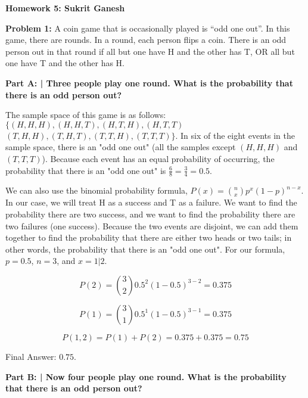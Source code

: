 \documentclass{article}
\begin{document}
 
 \begin{center}
     \Huge\textbf{Homework 5: Sukrit Ganesh}\par
 \end{center}
 
  \noindent\makebox[\linewidth]{\rule{\paperwidth}{0.4pt}}\newline
 
 \begin{center}
      \Large\textbf{Problem 1:} A coin game that is occasionally played is “odd one out”. In this game, there are rounds. In a round, each person flips a coin. There is an odd person out in that round if all but one have H and the other has T, OR all but one have T and the other has H. \par
 \end{center}
 
 \textbf{Part A: | Three people play one round. What is the probability that there is an odd person out?}\newline
 
 The sample space of this game is as follows: $\{(H, H, H), (H, H, T), (H, T, H), (H, T, T)$ $(T, H, H), (T, H, T), (T, T, H), (T, T, T)\}$. In six of the eight events in the sample space, there is an "odd one out" (all the samples except $(H, H, H)$ and $(T, T, T)$). Because each event has an equal probability of occurring, the probability that there is an "odd one out" is $\frac{6}{8} = \frac{3}{4} = 0.5$.\newline
 
 We can also use the binomial probability formula, $P(x)={n \choose x}p^x(1-p)^{n-x}$. In our case, we will treat H as a success and T as a failure. We want to find the probability there are two success, and we want to find the probability there are two failures (one success). Because the two events are disjoint, we can add them together to find the probability that there are either two heads or two tails; in other words, the probability that there is an "odd one out". For our formula, $p = 0.5$, $n = 3$, and $x = 1 | 2$.
 
 \[P(2)={3 \choose 2}0.5^2(1-0.5)^{3-2} = 0.375\]
 
 \[P(1)={3 \choose 1}0.5^1(1-0.5)^{3-1} = 0.375\]
 
 \[P(1, 2)=P(1)+P(2) = 0.375 + 0.375 = 0.75\]

 Final Answer: $0.75$.\newline
 
 \textbf{Part B: | Now four people play one round. What is the probability that there is an odd person out?}\newline
 
\end{document}
